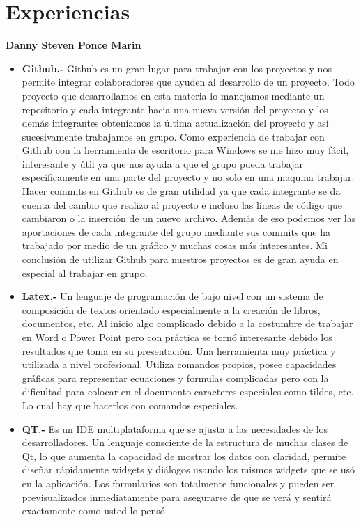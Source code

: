 \documentclass[10pt,oneside]{report}
\begin{document}
\chapter{Experiencias}
{\bf Danny Steven Ponce Marin \newline }
\begin{itemize}\renewcommand{\labelitemi}{$\bullet$}
	\item {\bf Github.-} \textsf{ Github es un gran lugar para trabajar con los proyectos y nos permite integrar colaboradores que ayuden al desarrollo de un proyecto. Todo proyecto que desarrollamos en esta materia lo manejamos mediante un repositorio y cada integrante hacia una nueva versión del proyecto y los demás integrantes obteníamos la última actualización del proyecto y así sucesivamente trabajamos en grupo. Como experiencia de trabajar con Github con la herramienta de escritorio para Windows se me hizo muy fácil, interesante y útil ya que nos ayuda a que el grupo pueda trabajar específicamente en una parte del proyecto y no solo en una maquina trabajar. Hacer commits en Github es  de gran utilidad ya que cada integrante se da cuenta del cambio que realizo al proyecto e incluso las líneas de código que cambiaron o la inserción de un nuevo archivo. Además de eso podemos ver las aportaciones de cada integrante del grupo mediante sus commits que ha trabajado por medio de un gráfico y muchas cosas más interesantes. Mi conclusión de utilizar Github para nuestros proyectos es de gran ayuda en especial al trabajar en grupo.}
	\item {\bf Latex.-}\textsf{ Un lenguaje de programación de bajo nivel con un sistema de composición de textos orientado especialmente a la creación de libros, documentos, etc. Al inicio algo complicado debido a la costumbre de trabajar en Word o Power Point pero con práctica se tornó interesante debido los resultados que toma en su presentación. Una herramienta muy práctica y utilizada a nivel profesional. Utiliza comandos propios, posee capacidades gráficas para representar ecuaciones y formulas complicadas pero con la dificultad para colocar en el documento caracteres especiales como tildes, etc. Lo cual hay que hacerlos con comandos especiales.}
	\item {\bf QT.-}\textsf{  Es un IDE multiplataforma que se ajusta a las necesidades de los desarrolladores. Un lenguaje consciente de la estructura de muchas clases de Qt, lo que aumenta la capacidad de mostrar los datos con claridad, permite diseñar rápidamente widgets y diálogos usando los mismos widgets que se usó en la aplicación. Los formularios son totalmente funcionales y pueden ser previsualizados inmediatamente para asegurarse de que se verá y sentirá exactamente como usted lo pensó  }

\end{itemize}
\end{document}
